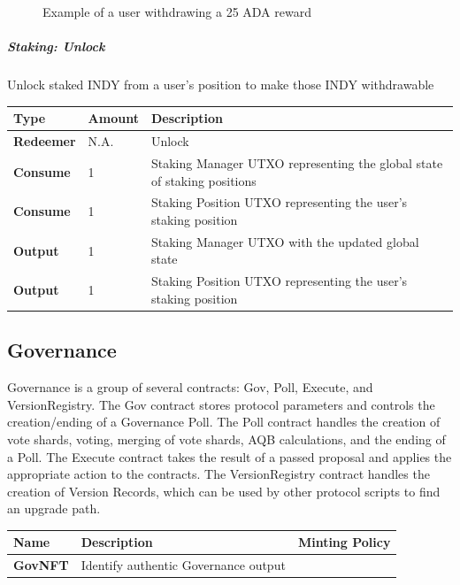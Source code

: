 \documentclass{article}
\begin{document}
\begin{sloppypar}
\filbreak

\hypertarget{staking-withdraw-rewards-figure}{%
\begin{figure}[htbp]
\centering

\caption{Example of a user withdrawing a 25 ADA reward}
\label{staking-withdraw-rewards-figure}
\end{figure}}

\hypertarget{staking-unlock}{%
\subparagraph{Staking: Unlock}\label{staking-unlock}}

Unlock staked INDY from a user's position to make those INDY
withdrawable

\begin{tabularx}{\linewidth}{l|l|L}
\toprule
\textbf{Type} & \textbf{Amount} & \textbf{Description}
\tabularnewline
\midrule
\endhead
\textbf{Redeemer} & N.A. & Unlock
\tabularnewline
\midrule
\textbf{Consume} & 1 & Staking Manager UTXO representing the global
state of staking positions
\tabularnewline
\midrule
\textbf{Consume} & 1 & Staking Position UTXO representing the user's
staking position
\tabularnewline
\midrule
\textbf{Output} & 1 & Staking Manager UTXO with the updated global
state
\tabularnewline
\midrule
\textbf{Output} & 1 & Staking Position UTXO representing the user's
staking position
\tabularnewline
\bottomrule
\end{tabularx}

\hypertarget{governance-1}{%
\subsection{Governance}\label{governance-1}}

Governance is a group of several contracts: Gov, Poll, Execute, and
VersionRegistry. The Gov contract stores protocol parameters and
controls the creation/ending of a Governance Poll. The Poll contract
handles the creation of vote shards, voting, merging of vote shards, AQB
calculations, and the ending of a Poll. The Execute contract takes the
result of a passed proposal and applies the appropriate action to the
contracts. The VersionRegistry contract handles the creation of Version
Records, which can be used by other protocol scripts to find an upgrade
path.

\begin{tabularx}{\linewidth}{l|L|L}
\caption{Governance native tokens}
\tabularnewline
\toprule
\textbf{Name} & \textbf{Description} & \textbf{Minting
Policy}
\tabularnewline
\midrule
\endhead
\textbf{GovNFT}
&
Identify authentic Governance output


\end{tabularx}
\end{sloppypar}
\end{document}
